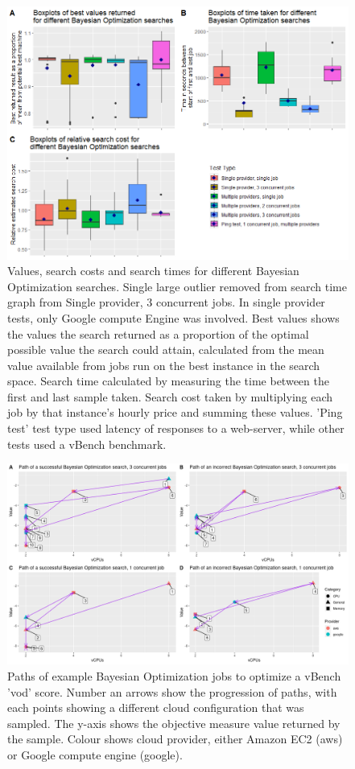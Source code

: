 \documentclass{report}
\begin{document}
\begin{figure}
  \caption{Values, search costs and search times for different Bayesian Optimization searches. Single large outlier removed from search time graph from Single provider, 3 concurrent jobs. In single provider tests, only Google compute Engine was involved. Best values shows the values the search returned as a proportion of the optimal possible value the search could attain, calculated from the mean value available from jobs run on the best instance in the search space. Search time calculated by measuring the time between the first and last sample taken. Search cost taken by multiplying each job by that instance's hourly price and summing these values. 'Ping test' test type used latency of responses to a web-server, while other tests used a vBench benchmark.}
  \label{fig:bo-boxplots}
  \centering
  \includegraphics[scale=0.7]{bo_boxplots}
\end{figure}
\begin{figure}
	\centering
	\includegraphics[scale=0.4]{paths}
	\caption{Paths of example Bayesian Optimization jobs to optimize a vBench 'vod' score. Number an arrows show the progression of paths, with each points showing a different cloud configuration that was sampled. The y-axis shows the objective measure value returned by the sample. Colour shows cloud provider, either Amazon EC2 (aws) or Google compute engine (google).}
	\label{fig:paths}
\end{figure}
\end{document}

